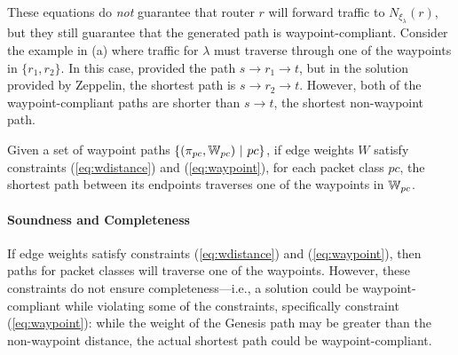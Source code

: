 These equations do \emph{not} guarantee that
router $r$ will forward traffic to  
$N_{\xi_\lambda}(r)$, but they still guarantee that the generated path is  waypoint-compliant. 
Consider the example in (a) where traffic for
$\lambda$ must traverse through one of the waypoints in $\{r_1, r_2\}$. 
In this case,  \genesis provided the path $s \rightarrow 
r_1 \rightarrow t$, but in the solution provided by Zeppelin, 
the shortest path is $s \rightarrow r_2
\rightarrow t$.
However, both of the waypoint-compliant paths are shorter 
than $s \rightarrow t$, the shortest non-waypoint path.

\iffull
\begin{theorem} \label{thm:waypoint}
	Given a set of waypoint paths $\{(\pi_{pc}, \mathbb{W}_{pc}) ~|~ pc\}$, if edge weights 
	$W$ satisfy constraints (\ref{eq:wdistance}) and (\ref{eq:waypoint}), for
	each packet class $pc$, the shortest path between its endpoints
	traverses one of the waypoints in $\mathbb{W}_{pc}$.
\end{theorem}

\fi

\paragraph{Soundness and Completeness}
If edge weights satisfy constraints (\ref{eq:wdistance}) and (\ref{eq:waypoint}), 
then paths for packet classes will traverse one of the waypoints. However, these
constraints do not ensure completeness---i.e., a solution could be waypoint-compliant
while violating some of the constraints, specifically constraint (\ref{eq:waypoint}):
while the weight of the Genesis path may be greater than the non-waypoint distance, 
the actual shortest path could be waypoint-compliant.


